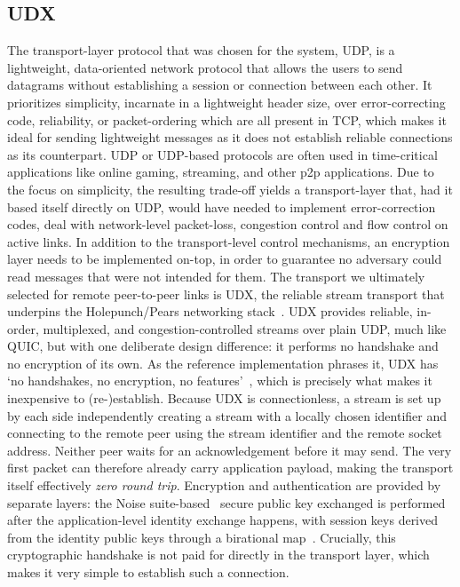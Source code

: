 \subsection{UDX}
\label{sec:udx}
The transport-layer protocol that was chosen for the system, UDP, is a lightweight, data-oriented network protocol that allows the users to send datagrams without establishing a session or connection between each other. It prioritizes simplicity, incarnate in a lightweight header size, over error-correcting code, reliability, or packet-ordering which are all present in TCP, which makes it ideal for sending lightweight messages as it does not establish reliable connections as its counterpart.
UDP or UDP-based protocols are often used in time-critical applications like online gaming, streaming, and other p2p applications.
Due to the focus on simplicity, the resulting trade-off yields a transport-layer that, had it based itself directly on UDP, would have needed to implement error-correction codes, deal with network-level packet-loss, congestion control and flow control on active links. In addition to the transport-level control mechanisms, an encryption layer needs to be implemented on-top, in order to guarantee no adversary could read messages that were not intended for them.
The transport we ultimately selected for remote peer-to-peer links is UDX, the reliable stream transport that underpins the Holepunch/Pears networking stack~\cite{udx}.
UDX provides reliable, in-order, multiplexed, and congestion-controlled streams over plain UDP, much like QUIC, but with one deliberate design difference: it performs no handshake and no encryption of its own.
As the reference implementation phrases it, UDX has `no handshakes, no encryption, no features'~\cite{udx}, which is precisely what makes it inexpensive to (re-)establish.
Because UDX is connectionless, a stream is set up by each side independently creating a stream with a locally chosen identifier and connecting to the remote peer using the stream identifier and the remote socket address. Neither peer waits for an acknowledgement before it may send.
The very first packet can therefore already carry application payload, making the transport itself effectively \emph{zero round trip}.
Encryption and authentication are provided by separate layers: the Noise suite-based~\cite{noise} secure public key exchanged is performed after the application-level identity exchange happens, with session keys derived from the identity public keys through a birational map~\cite{Zafar2025}.
Crucially, this cryptographic handshake is not paid for directly in the transport layer, which makes it very simple to establish such a connection.

